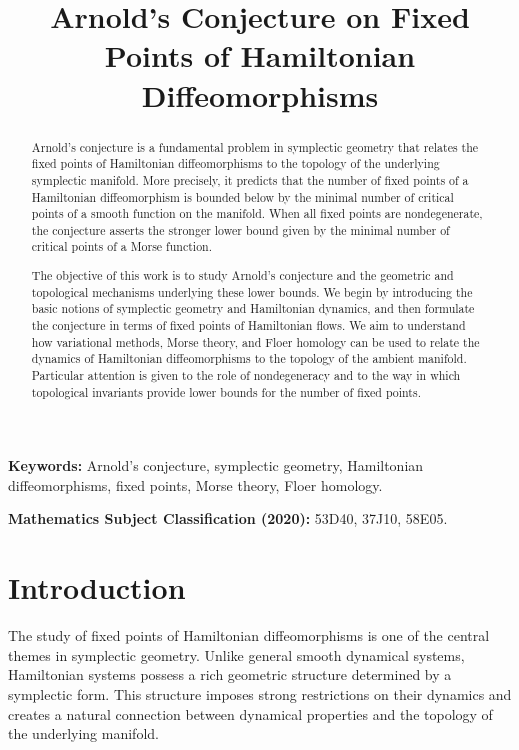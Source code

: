 \documentclass[11pt,a4paper]{article}
\title{\textbf{Arnold's Conjecture on Fixed Points of
		Hamiltonian Diffeomorphisms}}
\author{}
\date{}
\theoremstyle{plain}
\theoremstyle{definition}
\theoremstyle{remark}
\begin{document}
	
	\maketitle
	
	\begin{abstract}
		Arnold's conjecture is a fundamental problem in symplectic
		geometry that relates the fixed points of Hamiltonian
		diffeomorphisms to the topology of the underlying symplectic
		manifold. More precisely, it predicts that the number of
		fixed points of a Hamiltonian diffeomorphism is bounded below
		by the minimal number of critical points of a smooth function
		on the manifold. When all fixed points are nondegenerate,
		the conjecture asserts the stronger lower bound given by the
		minimal number of critical points of a Morse function.
		
		The objective of this work is to study Arnold's conjecture
		and the geometric and topological mechanisms underlying these
		lower bounds. We begin by introducing the basic notions of
		symplectic geometry and Hamiltonian dynamics, and then
		formulate the conjecture in terms of fixed points of
		Hamiltonian flows. We aim to understand how variational
		methods, Morse theory, and Floer homology can be used to
		relate the dynamics of Hamiltonian diffeomorphisms to the
		topology of the ambient manifold. Particular attention is
		given to the role of nondegeneracy and to the way in which
		topological invariants provide lower bounds for the number
		of fixed points.
	\end{abstract}
	
	\noindent
	\textbf{Keywords:}
	Arnold's conjecture, symplectic geometry, Hamiltonian
	diffeomorphisms, fixed points, Morse theory, Floer homology.
	
	\medskip
	
	\noindent
	\textbf{Mathematics Subject Classification (2020):}
	53D40, 37J10, 58E05.
	
	\section{Introduction}
	
	The study of fixed points of Hamiltonian diffeomorphisms is
	one of the central themes in symplectic geometry. Unlike
	general smooth dynamical systems, Hamiltonian systems possess
	a rich geometric structure determined by a symplectic form.
	This structure imposes strong restrictions on their dynamics
	and creates a natural connection between dynamical properties
	and the topology of the underlying manifold.
	
\end{document}
